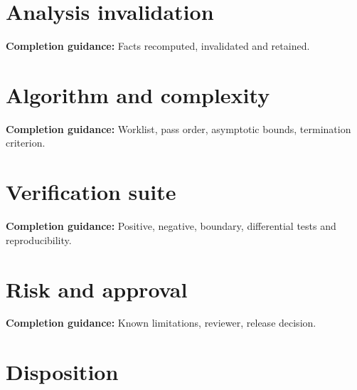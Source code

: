 \documentclass[10pt,letterpaper]{article}
\begin{document}
\section{Analysis invalidation}
\textbf{Completion guidance:} Facts recomputed, invalidated and retained.\par\medskip{}
\section{Algorithm and complexity}
\textbf{Completion guidance:} Worklist, pass order, asymptotic bounds, termination criterion.\par\medskip{}
\section{Verification suite}
\textbf{Completion guidance:} Positive, negative, boundary, differential tests and reproducibility.\par\medskip{}
\section{Risk and approval}
\textbf{Completion guidance:} Known limitations, reviewer, release decision.\par\medskip{}
\section{Disposition}
\end{document}
